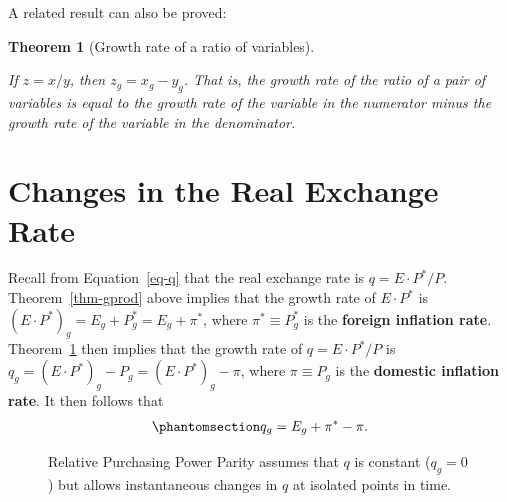 \documentclass[
  letterpaper,
]{book}
\theoremstyle{plain}
\newtheorem{theorem}{Theorem}[chapter]
\theoremstyle{remark}
\begin{document}
A related result can also be proved:

\begin{theorem}[Growth rate of a ratio of
variables]\protect\hypertarget{thm-gratio}{}\label{thm-gratio}

If \(z=x/y\), then \(z_g=x_g-y_g\). That is, the growth rate of the
ratio of a pair of variables is equal to the growth rate of the variable
in the numerator minus the growth rate of the variable in the
denominator.

\end{theorem}

\section{Changes in the Real Exchange Rate}\label{sec-longqg}

Recall from Equation~\ref{eq-q} that the real exchange rate is
\(q=E\cdot P^*/P\). Theorem~\ref{thm-gprod} above implies that the
growth rate of \(E\cdot P^*\) is \((E\cdot P^*)_g=E_g+P_g^*=E_g+\pi^*\),
where \(\pi^*\equiv P^*_g\) is the \textbf{foreign inflation rate}.
Theorem~\ref{thm-gratio} then implies that the growth rate of
\(q=E\cdot P^*/P\) is \(q_g=(E\cdot P^*)_g-P_g=(E\cdot P^*)_g-\pi\),
where \(\pi\equiv P_g\) is the \textbf{domestic inflation rate}. It then
follows that \begin{equation}\phantomsection\label{eq-qg}{
q_g=E_g+\pi^*-\pi.
}\end{equation}

\begin{figure}


\caption{\label{fig-q-steps}Relative Purchasing Power Parity assumes
that \(q\) is constant (\(q_g=0\)) but allows instantaneous changes in
\(q\) at isolated points in time.}

\end{figure}%
\end{document}
